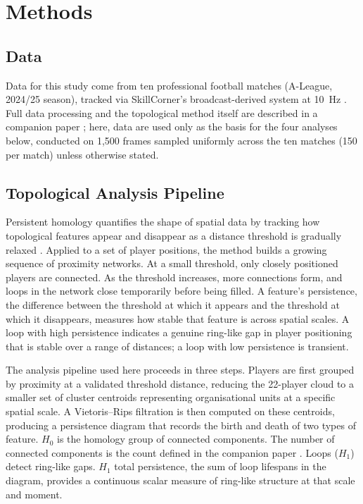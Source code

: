\section{Methods}

\subsection{Data}

Data for this study come from ten professional football matches
(A-League, 2024/25 season), tracked via SkillCorner's broadcast-derived
system at 10~Hz \cite{SkillCorner2024}. Full data processing and the
topological method itself are described in a companion paper
\cite{paperA}; here, data are used only as the basis for the four
analyses below, conducted on 1{,}500 frames sampled uniformly across
the ten matches (150 per match) unless otherwise stated.

\subsection{Topological Analysis Pipeline}

Persistent homology quantifies the shape of spatial data by tracking
how topological features appear and disappear as a distance threshold
is gradually relaxed \cite{paperA}. Applied to a set of player
positions, the method builds a growing sequence of proximity networks.
At a small threshold, only closely positioned players are connected. As
the threshold increases, more connections form, and loops in the network
close temporarily before being filled. A feature's persistence, the
difference between the threshold at which it appears and the threshold
at which it disappears, measures how stable that feature is across
spatial scales. A loop with high persistence indicates a genuine
ring-like gap in player positioning that is stable over a range of
distances; a loop with low persistence is transient.

The analysis pipeline used here proceeds in three steps. Players are
first grouped by proximity at a validated threshold distance, reducing
the 22-player cloud to a smaller set of cluster centroids representing
organisational units at a specific spatial scale. A Vietoris--Rips
filtration is then computed on these centroids, producing a persistence
diagram that records the birth and death of two types of feature.
$H_0$ is the homology group of connected components. The number of
connected components is the count defined in the companion paper
\cite{paperA}. Loops ($H_1$) detect ring-like gaps. $H_1$ total
persistence, the sum of loop lifespans in the diagram, provides a continuous scalar
measure of ring-like structure at that scale and moment.

